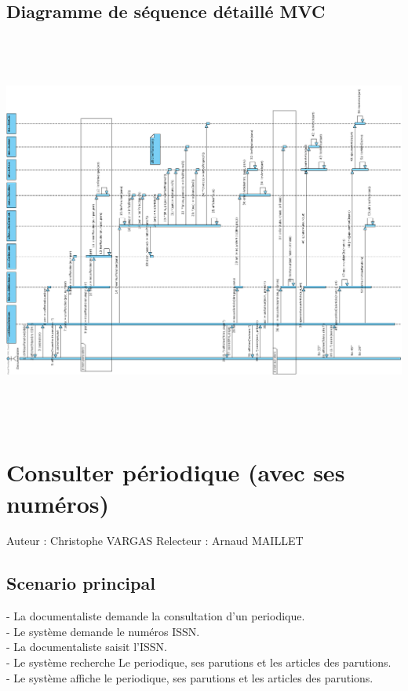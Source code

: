\documentclass[a4paper,10pt]{report}
\begin{document}
\section*{Diagramme de séquence détaillé MVC}
\includegraphics[height=130mm]{NouvNumPerMVC.png}

\newpage


\chapter*{Consulter périodique (avec ses numéros)}

Auteur : Christophe VARGAS
Relecteur : Arnaud MAILLET

\bigskip
\section*{Scenario principal}
\begin{flushleft}
- La documentaliste demande la consultation d'un periodique.\\
- Le système demande le numéros ISSN.\\
- La documentaliste saisit l'ISSN.\\
- Le système recherche Le periodique, ses parutions et les articles des parutions.\\
- Le système affiche le periodique, ses parutions et les articles des parutions.\\
\end{flushleft}
\end{document}
